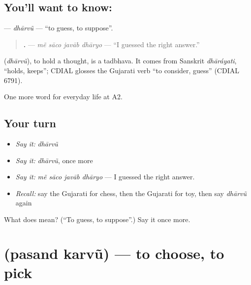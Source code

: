 \subsection*{You'll want to know: }
\textbf{} — \emph{dhārvũ} — \textquotedblleft{}to guess, to suppose\textquotedblright{}.

\begin{quote}
\textbf{   .} — \emph{mẽ sāco javāb dhāryo} — \textquotedblleft{}I guessed the right answer.\textquotedblright{}
\end{quote}

\begin{cousinweb}
\textbf{} (\emph{dhārvũ}), to hold a thought, is a tadbhava. It comes from Sanskrit \emph{dhāráyati}, \textquotedblleft{}holds, keeps\textquotedblright{}; CDIAL glosses the Gujarati verb \textquotedblleft{}to consider, guess\textquotedblright{} (CDIAL 6791).
\end{cousinweb}

\begin{grammarlens}[title={What you've built}]
One more word for everyday life at A2.
\end{grammarlens}

\subsection*{Your turn}
\begin{itemize}
\raggedright
  \item \emph{Say it:} \emph{dhārvũ}
  \item \emph{Say it:} \emph{dhārvũ}, once more
  \item \emph{Say it:} \emph{mẽ sāco javāb dhāryo} — I guessed the right answer.
  \item \emph{Recall:} say the Gujarati for chess, then the Gujarati for toy, then say \emph{dhārvũ} again
\end{itemize}

\begin{tcolorbox}[breakable,colback=teal!4,colframe=teal!35!black,title={Before you move on}]
What does  mean? (\textquotedblleft{}To guess, to suppose\textquotedblright{}.) Say it once more.
\end{tcolorbox}
\section[\texorpdfstring{\gu{પસંદ} \gu{કરવું} (pasand karvũ)}{પસંદ કરવું (pasand karvũ)}]{  (pasand karvũ) — to choose, to pick}

